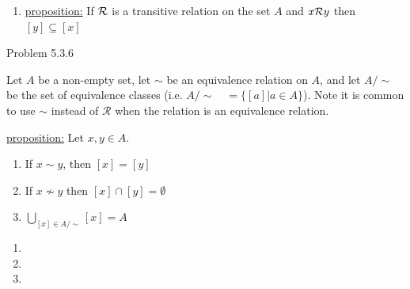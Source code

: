 \documentclass{article}
\theoremstyle{definition}
\begin{document}
	\begin{enumerate}
		\item[3] \underline{proposition:} If ${\cal R}$ is a transitive
		relation on the set $A$ and $x{\cal R}y$ then $[y]\subseteq [x]$

		\vspace{0.2cm}


		\vspace{0.2cm}


	\end{enumerate}

	\vspace{1cm}



	\noindent Problem 5.3.6  \vspace{0.3cm}

	Let $A$ be a non-empty set, let $\sim$ be an equivalence
	relation on $A$, and let $A/\sim$ be the set of equivalence classes (i.e. $A/\sim\quad=\{[a]|a\in A\}$). Note it is common to use $\sim$ instead of $\mathcal{R}$ when the relation is an equivalence relation.

	\medskip

	\underline{proposition:} Let $x,y\in A$.
	\begin{enumerate}
		\item[a] If $x\sim y$, then $[x]=[y]$
		\item[b] If $x\not\sim y$ then $[x]\cap [y]=\emptyset$
		\item[c] $\bigcup_{[x]\in A/\sim}[x]=A$
	\end{enumerate}

	\begin{enumerate}
		\item[a]
		 \vspace{.15cm}

		\item[b]
		 \vspace{.15cm}


		\item[c]
		 \vspace{.15cm}

	\end{enumerate}


	\vspace{.2cm}


\end{document}
